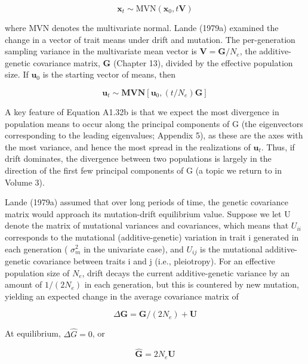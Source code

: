 \documentclass{article}
\begin{document}
\begin{equation}
\mathbf{x}_{t}\sim\mathrm{MVN}(\mathbf{x}_{0},t\mathbf{V})
\end{equation}

where MVN denotes the multivariate normal. Lande (1979a) examined the change in a vector of trait means under drift and mutation. The per-generation sampling variance in the multivariate mean vector is  $ \mathbf{V} = \mathbf{G}/N_e $, the additive-genetic covariance matrix,  $ \mathbf{G} $ (Chapter 13), divided by the effective population size. If  $ \mathbf{u}_0 $ is the starting vector of means, then

\begin{equation}
\mathbf{u}_{t}\sim\mathbf{M V N}[\mathbf{u}_{0},(t/N_{e})\mathbf{G}]
\end{equation}

A key feature of Equation A1.32b is that we expect the most divergence in population means to occur along the principal components of G (the eigenvectors corresponding to the leading eigenvalues; Appendix 5), as these are the axes with the most variance, and hence the most spread in the realizations of  $ \mathbf{u}_t $. Thus, if drift dominates, the divergence between two populations is largely in the direction of the first few principal components of G (a topic we return to in Volume 3).

Lande (1979a) assumed that over long periods of time, the genetic covariance matrix would approach its mutation-drift equilibrium value. Suppose we let U denote the matrix of mutational variances and covariances, which means that  $ U_{ii} $ corresponds to the mutational (additive-genetic) variation in trait i generated in each generation ( $ \sigma_m^2 $ in the univariate case), and  $ U_{ij} $ is the mutational additive-genetic covariance between traits i and j (i.e., pleiotropy). For an effective population size of  $ N_e $, drift decays the current additive-genetic variance by an amount of  $ 1/(2N_e) $ in each generation, but this is countered by new mutation, yielding an expected change in the average covariance matrix of

\begin{equation}
\Delta\mathbf{G}=\mathbf{G}/(2N_{e})+\mathbf{U}
\end{equation}

At equilibrium,  $ \Delta\widehat{G}=0 $, or

\begin{equation}
\hat{\mathbf{G}}=2N_{e}\mathbf{U}
\end{equation}
\end{document}
